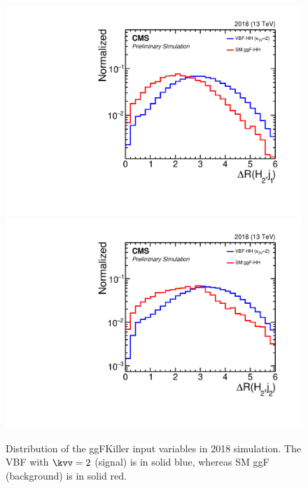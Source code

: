 \begin{figure}[htbp!]
\begin{center}
\includegraphics[width=0.27\linewidth]{Figures/AnalysisStrategy/eventselection/ggfkiller/2018ggfkiller/plot_2018_h_h2j1_deltaR.pdf}
\includegraphics[width=0.27\linewidth]{Figures/AnalysisStrategy/eventselection/ggfkiller/2018ggfkiller/plot_2018_h_h2j2_deltaR.pdf}
\end{center}
\caption[Distribution of the ggFKiller input  variables in 2018 simulation]{Distribution of the ggFKiller input  variables in 2018 simulation. The VBF with $\kvv=2$ (signal) is in solid blue, whereas SM ggF (background) is in solid red.}
\label{event_selection:fig:bdtvariables2018}
\end{figure}

\clearpage

